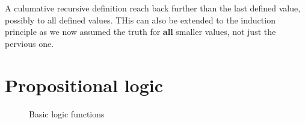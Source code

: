 \documentclass[12pt]{article} %
\begin{document}
A culumative recursive definition reach back further than the last defined value, possibly to all defined values. THis can also be extended to the induction principle as we now assumed the truth for \textbf{all} smaller values, not just the pervious one.

\section{Propositional logic}

\begin{figure}[H]
\caption{Basic logic functions}
\label{Basic logic functions}
\end{figure}
\end{document}
